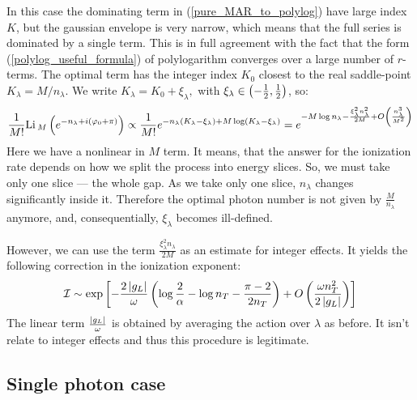 In this
case the dominating term in (\ref{pure_MAR_to_polylog}) have large index $K$, but the gaussian
envelope is very narrow, which means that the
full series is dominated by a single term. This is in full agreement
with the fact that the form (\ref{polylog_useful_formula}) of polylogarithm  converges
over a large number of $r$-terms. The optimal
term has the integer index $K_{0}$ closest to the real saddle-point
$K_{\lambda}=M/ n_\lambda$. We write $
K_{\lambda}=K_{0}+\xi_\lambda,$ with $\xi_\lambda \in \left(-\frac{1}{2}, \frac{1}{2}\right)$, so:
\begin{gather}
\label{pure_mar_slice_shit}
\frac{1}{M!}
	\mathrm{Li}\,_M
	\left(
	e^{-n_\lambda+i\left(\varphi_0+\pi\right)}\right)
	\propto
	\frac{1}{M!}
	e^{-n_\lambda
		\left(K_\lambda-\xi_\lambda\right)
	+
	M
	\log  \left(K_\lambda-\xi_\lambda\right)
	}
	=
	e^{- M\log{n_\lambda}
		-
		\frac{\xi_\lambda^2 n_\lambda^2}{2M}
		+
		O\left(\frac{n_\lambda^3}{M^2}\right)
	}
\end{gather}
Here we have a nonlinear in $ M $ term. It means, that the answer for the ionization rate depends on how we split the process into energy slices. So, we must take only one slice --- the whole gap. As we take only one slice, $ n_\lambda $ changes significantly inside it. Therefore the optimal photon number is not given by $ \frac{M}{n_\lambda} $ anymore, and, consequentially,  $\xi_\lambda $ becomes ill-defined. 

However, we can use the term $ \frac{\xi_\lambda^2 n_\lambda}{2M} $ as an estimate for integer effects. It yields the following correction in the ionization exponent:
\begin{gather}
	\mathcal{I}
	\sim
	\exp
	\left[
		-\frac{2\left|g_L\right|}{\omega}
		\left(
			\log\frac{2}{\alpha}
			-
				\log n_T
			-
			\frac{\pi-2}{2n_T}
		\right)
	+
		O\left(	
			\frac{\omega n_T^2}{2\left|g_L\right|}\right)
	\right]
\end{gather}
The linear term $ \frac{\left|g_L\right|}{\omega} $ is obtained by averaging the action over $ \lambda $ as before. It isn't relate to integer effects and thus this procedure is legitimate.
\subsection{Single photon case}
\label{subsect:single_photon}


